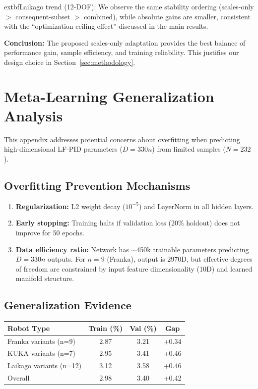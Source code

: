 \documentclass[DTMColor]{ROB-New}
\begin{document}
	extbf{Laikago trend (12-DOF):} We observe the same stability ordering (scales-only $>$ consequent-subset $>$ combined), while absolute gains are smaller, consistent with the ``optimization ceiling effect'' discussed in the main results.

\textbf{Conclusion:} The proposed scales-only adaptation provides the best balance of performance gain, sample efficiency, and training reliability. This justifies our design choice in Section~\ref{sec:methodology}.

\newpage
\section{Meta-Learning Generalization Analysis}
\label{app:meta_generalization}

This appendix addresses potential concerns about overfitting when predicting high-dimensional LF-PID parameters ($D=330n$) from limited samples ($N=232$).

\subsection{Overfitting Prevention Mechanisms}

\begin{enumerate}[leftmargin=*, itemsep=2pt]
    \item \textbf{Regularization:} L2 weight decay ($10^{-5}$) and LayerNorm in all hidden layers.
    \item \textbf{Early stopping:} Training halts if validation loss (20\% holdout) does not improve for 50 epochs.
    \item \textbf{Data efficiency ratio:} Network has $\sim$450k trainable parameters predicting $D=330n$ outputs. For $n=9$ (Franka), output is 2970D, but effective degrees of freedom are constrained by input feature dimensionality (10D) and learned manifold structure.
\end{enumerate}

\subsection{Generalization Evidence}

\begin{table}[h]
{\begin{fntable}\centering
\begin{tabular}{@{}lccc@{}}
\hline
\textbf{Robot Type} & \textbf{Train (\%)} & \textbf{Val (\%)} & \textbf{Gap} \\
\hline
Franka variants (n=9) & 2.87 & 3.21 & +0.34 \\
KUKA variants (n=7) & 2.95 & 3.41 & +0.46 \\
Laikago variants (n=12) & 3.12 & 3.58 & +0.46 \\
\hline
Overall & 2.98 & 3.40 & +0.42 \\
\hline
\end{tabular}
\end{fntable}}
\end{table}
\end{document}
